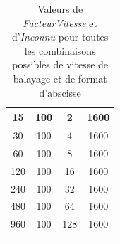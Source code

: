 \documentclass[a4paper, 12pt]{article}
\begin{document}
\begin{longtable}[c]{|c|c|c|c|}
15         & 100             & 2              & 1600    \\ \hline
30         & 100             & 4              & 1600    \\ \hline
60         & 100             & 8              & 1600    \\ \hline
120        & 100             & 16             & 1600    \\ \hline
240        & 100             & 32             & 1600    \\ \hline
480        & 100             & 64             & 1600    \\ \hline
960        & 100             & 128            & 1600    \\ \hline

\caption{Valeurs de \emph{FacteurVitesse} et d'\emph{Inconnu} pour toutes les combinaisons possibles de vitesse de balayage et de format d'abscisse}

\label{tab:ValeursFacteurVitesse}\\
\end{longtable}
\end{document}
